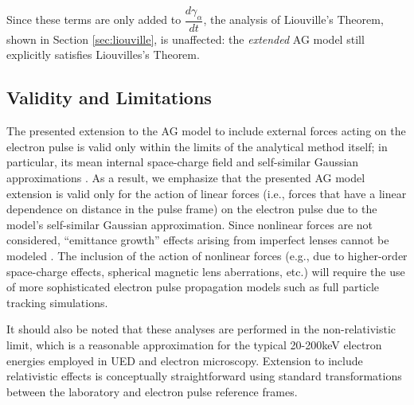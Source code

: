 Since these terms are only added to $\dfrac{d \gamma_{\alpha}}{d t}$, the analysis of Liouville's Theorem, shown in Section \ref{sec:liouville}, is unaffected: the \textit{extended} AG model still explicitly satisfies Liouvilles's Theorem.

\subsection{Validity and Limitations} \label{extension_limitations}

The presented extension to the AG model to include external forces acting on the electron pulse is valid only within the limits of the analytical method itself; in particular, its mean internal space-charge field and self-similar Gaussian approximations \cite{michalik_analytic_2006}.
As a result, we emphasize that the presented AG model extension is valid only for the action of linear forces (i.e., forces that have a linear dependence on distance in the pulse frame) on the electron pulse due to the model's self-similar Gaussian approximation.
Since nonlinear forces are not considered, ``emittance growth'' effects arising from imperfect lenses cannot be modeled \cite{oshea_reversible_1998}.
The inclusion of the action of nonlinear forces (e.g., due to higher-order space-charge effects, spherical magnetic lens aberrations, etc.) will require the use of more sophisticated electron pulse propagation models such as full particle tracking simulations.

It should also be noted that these analyses are performed in the non-relativistic limit, which is a reasonable approximation for the typical 20-200keV electron energies employed in UED and electron microscopy.
Extension to include relativistic effects is conceptually straightforward using standard transformations between the laboratory and electron pulse reference frames.

